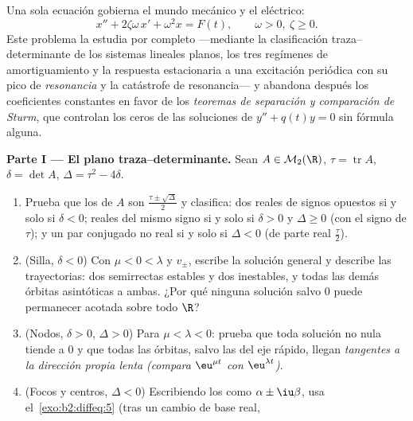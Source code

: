 \begin{problem}\label{pb:b2:diffeq:1}
Una sola ecuación gobierna el mundo mecánico y el eléctrico:
\[
x'' + 2\zeta\omega\,x' + \omega^2 x = F(t),
\qquad \omega > 0,\ \zeta \geq 0 .
\]
Este problema la estudia por completo ---mediante la clasificación
traza--determinante de los sistemas lineales planos, los tres
regímenes de amortiguamiento y la respuesta estacionaria a una
excitación periódica con su pico de
\emph{resonancia} y la catástrofe de
resonancia--- y abandona después los coeficientes constantes en
favor de los \emph{teoremas de separación y comparación de
Sturm}, que controlan los
ceros de las soluciones de $y'' + q(t)y = 0$ sin fórmula alguna.

\medskip
\noindent\textbf{Parte I --- El plano traza--determinante.} Sean $A
\in \mathcal M_2(\R)$, $\tau = \operatorname{tr}A$, $\delta = \det
A$, $\Delta = \tau^2 - 4\delta$.
\begin{enumerate}
  \item Prueba que los  de $A$ son
        $\frac{\tau\pm\sqrt\Delta}{2}$ y clasifica: dos
         reales de signos opuestos si y solo si
        $\delta < 0$;  reales del mismo signo si y
        solo si $\delta > 0$ y $\Delta \geq 0$ (con el signo de
        $\tau$); y un par conjugado no real si y solo si $\Delta <
        0$ (de parte real $\frac\tau2$).
  \item (Silla, $\delta < 0$) Con  $\mu < 0 <
        \lambda$ y  $v_\pm$, escribe la solución
        general y describe las trayectorias: dos semirrectas
        estables y dos inestables, y todas las demás órbitas
        asintóticas a ambas. ¿Por qué ninguna solución salvo $0$
        puede permanecer acotada sobre todo $\R$?
  \item (Nodos, $\delta > 0$, $\Delta > 0$) Para $\mu < \lambda <
        0$: prueba que toda solución no nula tiende a $0$ y que
        todas las órbitas, salvo las del eje rápido, llegan
        \emph{tangentes a la dirección propia lenta}
        \emph{(compara $\eu^{\mu t}$ con $\eu^{\lambda t}$)}.
  \item (Focos y centros, $\Delta < 0$) Escribiendo los
         como $\alpha \pm \iu\beta$, usa el~\cref{exo:b2:diffeq:5} (tras un cambio de base real,

\end{enumerate}
\end{problem}
